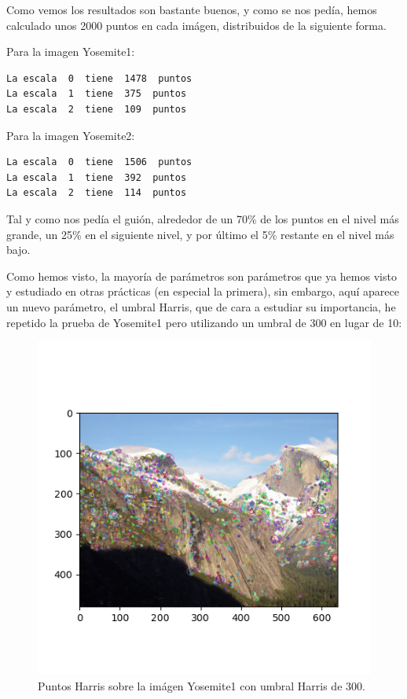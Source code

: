 \documentclass[12pt, spanish]{article}
\begin{document}
Como vemos los resultados son bastante buenos, y como se nos pedía, hemos calculado unos 2000 puntos en cada imágen, distribuidos de la siguiente forma.

Para la imagen Yosemite1:

\begin{lstlisting}
La escala  0  tiene  1478  puntos
La escala  1  tiene  375  puntos
La escala  2  tiene  109  puntos
\end{lstlisting}

Para la imagen Yosemite2:

\begin{lstlisting}
La escala  0  tiene  1506  puntos
La escala  1  tiene  392  puntos
La escala  2  tiene  114  puntos
\end{lstlisting}

Tal y como nos pedía el guión, alrededor de un 70\% de los puntos en el nivel más grande, un 25\% en el siguiente nivel, y por último el 5\% restante en el nivel más bajo.


Como hemos visto, la mayoría de parámetros son parámetros que ya hemos visto y estudiado en otras prácticas (en especial la primera), sin embargo, aquí aparece un nuevo parámetro, el umbral Harris, que de cara a estudiar su importancia, he repetido la prueba de Yosemite1 pero utilizando un umbral de 300 en lugar de 10:

\begin{figure}[H]
  \centering
      \includegraphics[width=\textwidth]{p_harris_h_300.png}
 		\caption{Puntos Harris sobre la imágen Yosemite1 con umbral Harris de 300.}
\end{figure}
\end{document}
